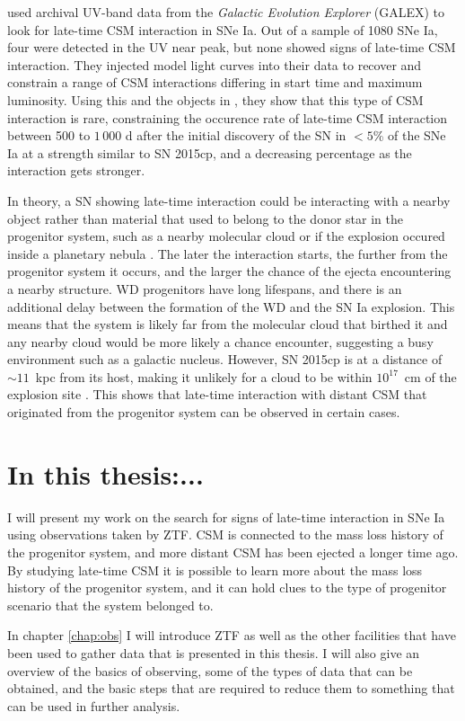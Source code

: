 \documentclass[a4paper,oneside,12pt, class=Latex/Classes/PhDthesisPSnPDF, crop=false]{standalone}
\begin{document}
\citet{GALEX_Late_CSM} used archival UV-band data from the \textit{Galactic Evolution Explorer} (GALEX) to look for late-time CSM interaction in SNe Ia. Out of a sample of 1080 SNe Ia, four were detected in the UV near peak, but none showed signs of late-time CSM interaction. They injected model light curves into their data to recover and constrain a range of CSM interactions differing in start time and maximum luminosity. Using this and the objects in \citet{2015cp}, they show that this type of CSM interaction is rare, constraining the occurence rate of late-time CSM interaction between 500 to $1\,000$ d after the initial discovery of the SN in $<5$\% of the SNe Ia at a strength similar to SN 2015cp, and a decreasing percentage as the interaction gets stronger.

In theory, a SN showing late-time interaction could be interacting with a nearby object rather than material that used to belong to the donor star in the progenitor system, such as a nearby molecular cloud or if the explosion occured inside a planetary nebula \citep{snips}. The later the interaction starts, the further from the progenitor system it occurs, and the larger the chance of the ejecta encountering a nearby structure. WD progenitors have long lifespans, and there is an additional delay between the formation of the WD and the SN Ia explosion. This means that the system is likely far from the molecular cloud that birthed it and any nearby cloud would be more likely a chance encounter, suggesting a busy environment such as a galactic nucleus. However, SN 2015cp is at a distance of $\sim11$~kpc from its host, making it unlikely for a cloud to be within $10^{17}$~cm of the explosion site \citep{2015cp}. This shows that late-time interaction with distant CSM that originated from the progenitor system can be observed in certain cases.


\section{In this thesis:...}
I will present my work on the search for signs of late-time interaction in SNe Ia using observations taken by ZTF. CSM is connected to the mass loss history of the progenitor system, and more distant CSM has been ejected a longer time ago. By studying late-time CSM it is possible to learn more about the mass loss history of the progenitor system, and it can hold clues to the type of progenitor scenario that the system belonged to.

In chapter \ref{chap:obs} I will introduce ZTF as well as the other facilities that have been used to gather data that is presented in this thesis. I will also give an overview of the basics of observing, some of the types of data that can be obtained, and the basic steps that are required to reduce them to something that can be used in further analysis.
\end{document}
